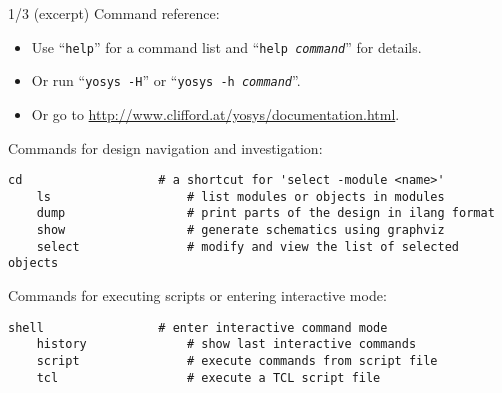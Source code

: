 \begin{frame}[fragile]{\subsecname{} 1/3 \hspace{0pt plus 1 filll} (excerpt)}
Command reference:
\begin{itemize}
\item Use ``{\tt help}'' for a command list and ``{\tt help \it command}'' for details.
\item Or run ``{\tt yosys -H}'' or ``{\tt yosys -h \it command}''.
\item Or go to \url{http://www.clifford.at/yosys/documentation.html}.
\end{itemize}

\bigskip
Commands for design navigation and investigation:
\begin{lstlisting}[xleftmargin=1cm, basicstyle=\ttfamily\fontsize{8pt}{10pt}\selectfont, language=ys]
    cd                   # a shortcut for 'select -module <name>'
    ls                   # list modules or objects in modules
    dump                 # print parts of the design in ilang format
    show                 # generate schematics using graphviz
    select               # modify and view the list of selected objects
\end{lstlisting}

\bigskip
Commands for executing scripts or entering interactive mode:
\begin{lstlisting}[xleftmargin=1cm, basicstyle=\ttfamily\fontsize{8pt}{10pt}\selectfont, language=ys]
    shell                # enter interactive command mode
    history              # show last interactive commands
    script               # execute commands from script file
    tcl                  # execute a TCL script file
\end{lstlisting}
\end{frame}

